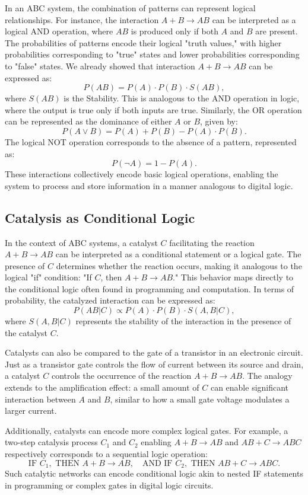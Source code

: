 \documentclass[entropy,article,submit,pdftex,moreauthors]{Definitions/mdpi}
\begin{document}
In an ABC system, the combination of patterns can represent logical relationships. For instance, the interaction \( A + B \to AB \) can be interpreted as a logical AND operation, where \( AB \) is produced only if both \( A \) and \( B \) are present. The probabilities of patterns encode their logical "truth values," with higher probabilities corresponding to "true" states and lower probabilities corresponding to "false" states. We already showed that interaction \( A + B \to AB \) can be expressed as:
\[
P(AB) = P(A) \cdot P(B) \cdot S(AB),
\]
where \( S(AB) \) is the Stability. This is analogous to the AND operation in logic, where the output is true only if both inputs are true. Similarly, the OR operation can be represented as the dominance of either \( A \) or \( B \), given by:
\[
P(A \lor B) = P(A) + P(B) - P(A) \cdot P(B).
\]
The logical NOT operation corresponds to the absence of a pattern, represented as:
\[
P(\neg A) = 1 - P(A).
\]
These interactions collectively encode basic logical operations, enabling the system to process and store information in a manner analogous to digital logic.

\subsection{Catalysis as Conditional Logic}

In the context of ABC systems, a catalyst \( C \) facilitating the reaction \( A + B \to AB \) can be interpreted as a conditional statement or a logical gate. The presence of \( C \) determines whether the reaction occurs, making it analogous to the logical "if" condition: "If \( C \), then \( A + B \to AB \)."
This behavior maps directly to the conditional logic often found in programming and computation. In terms of probability, the catalyzed interaction can be expressed as:
\[
P(AB | C) \propto P(A) \cdot P(B) \cdot S(A, B | C),
\]
where \( S(A, B | C) \) represents the stability of the interaction in the presence of the catalyst \( C \).

Catalysts can also be compared to the gate of a transistor in an electronic circuit. Just as a transistor gate controls the flow of current between its source and drain, a catalyst \( C \) controls the occurrence of the reaction \( A + B \to AB \). The analogy extends to the amplification effect: a small amount of \( C \) can enable significant interaction between \( A \) and \( B \), similar to how a small gate voltage modulates a larger current.

Additionally, catalysts can encode more complex logical gates. For example, a two-step catalysis process \( C_1 \) and \( C_2 \) enabling \( A + B \to AB \) and \( AB + C \to ABC \) respectively corresponds to a sequential logic operation:
\[
\text{IF } C_1, \text{ THEN } A + B \to AB, \quad \text{AND IF } C_2, \text{ THEN } AB + C \to ABC.
\]
Such catalytic networks can encode conditional logic akin to nested IF statements in programming or complex gates in digital logic circuits. 
\end{document}
